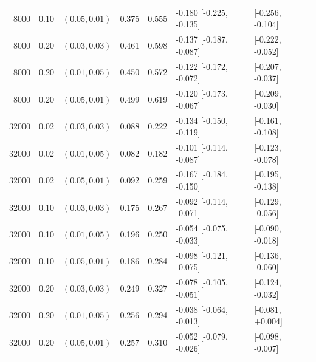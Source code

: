 \begin{table}[!htbp]
\begin{tabular}{@{}rrlrrll@{}}
8000 & 0.10 & $(0.05,0.01)$ & 0.375 & 0.555 & -0.180 [-0.225, -0.135] & [-0.256, -0.104] \\
8000 & 0.20 & $(0.03,0.03)$ & 0.461 & 0.598 & -0.137 [-0.187, -0.087] & [-0.222, -0.052] \\
8000 & 0.20 & $(0.01,0.05)$ & 0.450 & 0.572 & -0.122 [-0.172, -0.072] & [-0.207, -0.037] \\
8000 & 0.20 & $(0.05,0.01)$ & 0.499 & 0.619 & -0.120 [-0.173, -0.067] & [-0.209, -0.030] \\
32000 & 0.02 & $(0.03,0.03)$ & 0.088 & 0.222 & -0.134 [-0.150, -0.119] & [-0.161, -0.108] \\
32000 & 0.02 & $(0.01,0.05)$ & 0.082 & 0.182 & -0.101 [-0.114, -0.087] & [-0.123, -0.078] \\
32000 & 0.02 & $(0.05,0.01)$ & 0.092 & 0.259 & -0.167 [-0.184, -0.150] & [-0.195, -0.138] \\
32000 & 0.10 & $(0.03,0.03)$ & 0.175 & 0.267 & -0.092 [-0.114, -0.071] & [-0.129, -0.056] \\
32000 & 0.10 & $(0.01,0.05)$ & 0.196 & 0.250 & -0.054 [-0.075, -0.033] & [-0.090, -0.018] \\
32000 & 0.10 & $(0.05,0.01)$ & 0.186 & 0.284 & -0.098 [-0.121, -0.075] & [-0.136, -0.060] \\
32000 & 0.20 & $(0.03,0.03)$ & 0.249 & 0.327 & -0.078 [-0.105, -0.051] & [-0.124, -0.032] \\
32000 & 0.20 & $(0.01,0.05)$ & 0.256 & 0.294 & -0.038 [-0.064, -0.013] & [-0.081, +0.004] \\
32000 & 0.20 & $(0.05,0.01)$ & 0.257 & 0.310 & -0.052 [-0.079, -0.026] & [-0.098, -0.007] \\
\bottomrule
\end{tabular}
\end{table}
